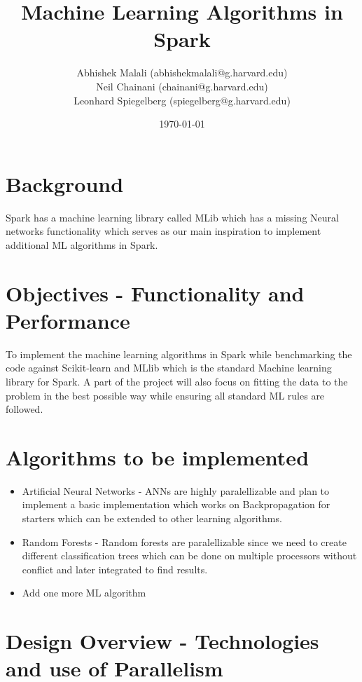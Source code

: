 \documentclass{article}
\begin{document}
	\title{Machine Learning Algorithms in Spark}
	\author{Abhishek Malali (abhishekmalali@g.harvard.edu)\\
			Neil Chainani (chainani@g.harvard.edu)\\
			Leonhard Spiegelberg (spiegelberg@g.harvard.edu)}
	\date{\today}
	\maketitle
	\section{Background}
	Spark has a machine learning library called MLib which has a missing Neural networks functionality which serves as our main inspiration to implement additional ML algorithms in Spark.

	
	\section{Objectives - Functionality and Performance}
	To implement the machine learning algorithms in Spark while benchmarking the code against Scikit-learn and MLlib which is the standard Machine learning library for Spark. A part of the project will also focus on fitting the data to the problem in the best possible way while ensuring all standard ML rules are followed.

	\section{Algorithms to be implemented}
		\begin{itemize}
			\item Artificial Neural Networks - ANNs are highly paralellizable and plan to implement a basic implementation which works on Backpropagation for starters which can be extended to other learning algorithms.
			\item Random Forests - Random forests are paralellizable since we need to create different classification trees which can be done on multiple processors without conflict and later integrated to find results.
			\item Add one more ML algorithm
		\end{itemize}

	\section{Design Overview - Technologies and use of Parallelism}
	
\end{document}
